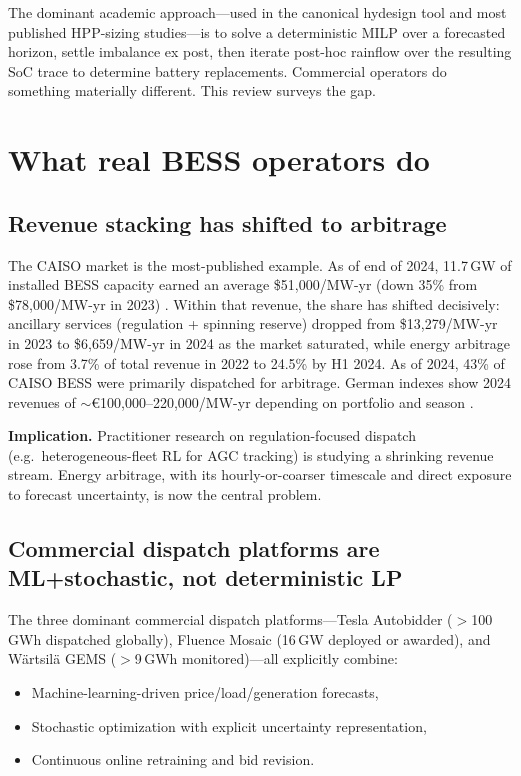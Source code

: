 \documentclass[11pt]{article}
\begin{document}
The dominant academic approach---used in the canonical hydesign tool \citep{murcia2024hydesign} and most published HPP-sizing studies---is to solve a deterministic MILP over a forecasted horizon, settle imbalance ex post, then iterate post-hoc rainflow over the resulting SoC trace to determine battery replacements. Commercial operators do something materially different. This review surveys the gap.

\section{What real BESS operators do}

\subsection{Revenue stacking has shifted to arbitrage}

The CAISO market is the most-published example. As of end of 2024, 11.7\,GW of installed BESS capacity earned an average \$51{,}000/MW-yr (down 35\% from \$78{,}000/MW-yr in 2023) \citep{caiso2024battery}. Within that revenue, the share has shifted decisively: ancillary services (regulation + spinning reserve) dropped from \$13{,}279/MW-yr in 2023 to \$6{,}659/MW-yr in 2024 as the market saturated, while energy arbitrage rose from 3.7\% of total revenue in 2022 to 24.5\% by H1 2024. As of 2024, 43\% of CAISO BESS were primarily dispatched for arbitrage. German indexes show 2024 revenues of \(\sim\)\euro100{,}000--220{,}000/MW-yr depending on portfolio and season \citep{esnews2024germanindex}.

\textbf{Implication.} Practitioner research on regulation-focused dispatch (e.g.\ heterogeneous-fleet RL for AGC tracking) is studying a shrinking revenue stream. Energy arbitrage, with its hourly-or-coarser timescale and direct exposure to forecast uncertainty, is now the central problem.

\subsection{Commercial dispatch platforms are ML+stochastic, not deterministic LP}

The three dominant commercial dispatch platforms---Tesla Autobidder ($>$100\,GWh dispatched globally), Fluence Mosaic (16\,GW deployed or awarded), and W\"{a}rtsil\"{a} GEMS ($>$9\,GWh monitored)---all explicitly combine:

\begin{itemize}
\item Machine-learning-driven price/load/generation forecasts,
\item Stochastic optimization with explicit uncertainty representation,
\item Continuous online retraining and bid revision.
\end{itemize}
\end{document}
